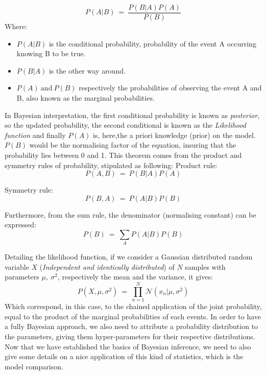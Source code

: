 \documentclass[twocolumn,12pt]{article}
\begin{document}
\begin{equation}
    P(A|B)\ =\ \frac{P(B|A)P(A)}{P(B)}
\end{equation}
Where:
\begin{itemize}
    \item $P(A|B)$ is the conditional probability, probability of the event A occurring knowing B to be true.
    \item $P(B|A)$ is the other way around.
    \item $P(A)\ \text{and}\ P(B)$ respectively the probabilities of observing the event A and B, also known as the marginal probabilities.
\end{itemize}
In Bayesian interpretation, the first conditional probability is known as \emph{posterior}, so the updated probability, the second conditional is known as the \emph{Likelihood function} and finally $P(A)$ is, here,the a priori knowledge (prior) on the model.
$P(B)$ would be the normalising factor of the equation, insuring that the probability lies between 0 and 1.
This theorem comes from the product and symmetry rules of probability, stipulated as following:
Product rule:\\
$$P(A,B)\ =\ P(B|A)P(A)$$


Symmetry rule:\\
$$P(B,A)\ =\ P(A|B)P(B)$$


Furthermore, from the sum rule, the denominator (normalising constant) can be expressed:\\
$$P(B)\ =\ \sum_AP(A|B)P(B)$$


Detailing the likelihood function, if we consider a Gaussian distributed random variable $X$ (\emph{Independent and identically distributed}) of $N$ samples with parameters $\mu,\ \sigma^2$, respectively the mean and the variance, it gives:
\begin{equation}
    P(X,\mu,\sigma^2)\ =\ \prod_{n=1}^N\mathcal{N}(x_n|\mu,\sigma^2)
    \label{equ:NormalLikelihood}
\end{equation}
Which correspond, in this case, to the chained application of the joint probability, equal to the product of the marginal probabilities of each events.
In order to have a fully Bayesian approach, we also need to attribute a probability distribution to the parameters, giving them hyper-parameters for their respective distributions.\\
Now that we have established the basics of Bayesian inference, we need to also give some details on a nice application of this kind of statistics, which is the model comparison.
\end{document}

